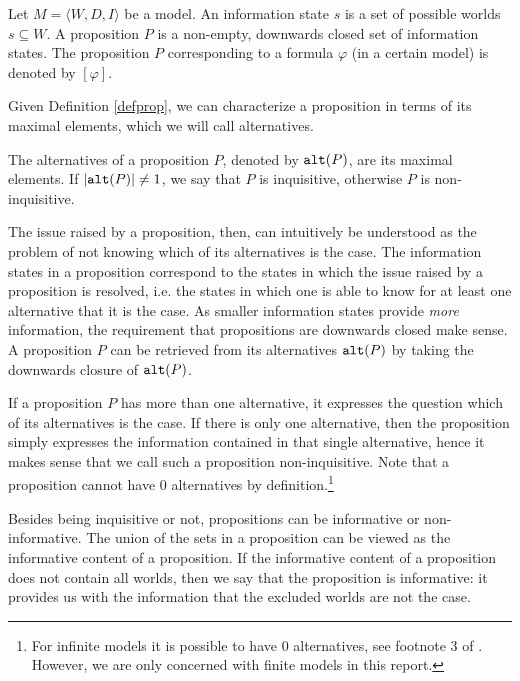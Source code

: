 \begin{defi}\label{defprop}
 Let $M=\langle W,D,I\rangle$ be a model. An information state $s$ is a set of possible worlds $s\subseteq W$. A proposition $P$ is a non-empty, downwards closed set of information states. The proposition $P$ corresponding to a formula $\varphi$ (in a certain model) is denoted by $[\varphi]$.
\end{defi}

Given Definition \ref{defprop}, we can characterize a proposition in terms of its maximal elements, which we will call alternatives. 

\begin{defi}\label{defalt}
 The alternatives of a proposition $P$, denoted by $\texttt{alt}(P)$, are its maximal elements. If $|\texttt{alt}(P)|\neq 1$, we say that $P$ is inquisitive, otherwise $P$ is non-inquisitive.
\end{defi}

The issue raised by a proposition, then, can intuitively be understood as the problem of not knowing which of its alternatives is the case. The information states in a proposition correspond to the states in which the issue raised by a proposition is resolved, i.e. the states in which one is able to know for at least one alternative that it is the case. As smaller information states provide \emph{more} information, the requirement that propositions are downwards closed make sense. A proposition $P$ can be retrieved from its alternatives $\texttt{alt}(P)$ by taking the downwards closure of $\texttt{alt}(P)$.

If a proposition $P$ has more than one alternative, it expresses the question which of its alternatives is the case. If there is only one alternative, then the proposition simply expresses the information contained in that single alternative, hence it makes sense that we call such a proposition non-inquisitive. Note that a proposition cannot have $0$ alternatives by definition.\footnote{For infinite models it is possible to have $0$ alternatives, see footnote 3 of \cite[p.\ 20]{inquisitive19}. However, we are only concerned with finite models in this report.}

Besides being inquisitive or not, propositions can be informative or non-informative. The union of the sets in a proposition can be viewed as the informative content of a proposition. If the informative content of a proposition does not contain all worlds, then we say that the proposition is informative: it provides us with the information that the excluded worlds are not the case. 

